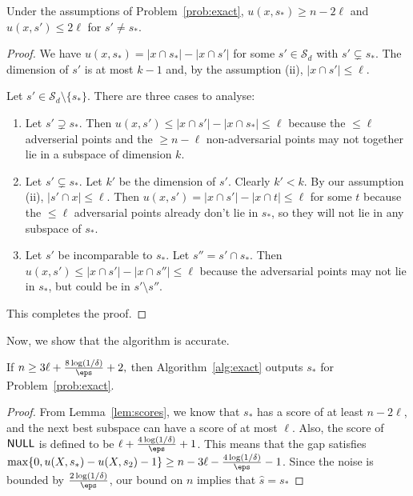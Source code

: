 \begin{lemma}\label{lem:scores}
    Under the assumptions of Problem~\ref{prob:exact}, $u(x,s_*) \ge n - 2\ell$
    and $u(x,s')\le 2\ell$ for $s' \ne s_*$.
\end{lemma}
\begin{proof}
    We have $u(x,s_*) = |x \cap s_*| - |x \cap s'|$ for some
    $s' \in \mathcal{S}_d$ with $s' \subsetneq s_*$. The
    dimension of $s'$ is at most $k-1$ and, by the assumption
    (ii), $|x \cap s'| \le \ell$. 
    
    Let $s' \in \mathcal{S}_d \setminus \{s_*\}$.
    There are three cases to analyse:
    \begin{enumerate}
        \item Let $s' \supsetneq s_*$. Then
            $u(x,s') \le |x \cap s'| - |x \cap s_*| \leq \ell$
            because the $\leq \ell$ adverserial points and the $\geq n-\ell$
            non-adversarial points may not together lie in a subspace
            of dimension $k$.

        \item Let $s' \subsetneq s_*$. Let
            $k'$ be the dimension of $s'$. Clearly $k'<k$.
            By our assumption (ii), $|s' \cap x| \le \ell$.
            Then $u(x,s') = |x \cap s'| - |x \cap t| \le \ell$
            for some $t$ because the $\leq \ell$ adversarial points
            already don't lie in $s_*$, so they will not lie in
            any subspace of $s_*$.

        \item Let $s'$ be incomparable to $s_*$.
            Let $s'' = s' \cap s_*$. Then
            $u(x,s') \le |x \cap s'| - |x \cap s''| \leq \ell$
            because the adversarial points may not lie in $s_*$,
            but could be in $s'\setminus s''$.
    \end{enumerate}
    This completes the proof.
\end{proof}

Now, we show that the algorithm is accurate.

\begin{lemma}\label{lem:exact-accuracy}
    If
    $n \geq 3\ell + \frac{8\log(1/\delta)}{\eps} + 2,$
    then Algorithm~\ref{alg:exact} outputs $s_*$ for Problem~\ref{prob:exact}.
\end{lemma}
\begin{proof}
    From Lemma~\ref{lem:scores}, we know that $s_*$ has
    a score of at least $n-2\ell$, and the next best subspace
    can have a score of at most $\ell$. Also, the score of
    $\mathsf{NULL}$ is defined to be $\ell + \tfrac{4\log(1/\delta)}{\eps} + 1$.
    This means that the gap satisfies $\max\{ 0 , u(X,s_*) - u(X,s_2) -1\} \ge n - 3\ell - \tfrac{4\log(1/\delta)}{\eps}  -1$.
    Since the noise is bounded by $\tfrac{2\log(1/\delta)}{\eps}$, our bound on $n$ implies that $\hat s = s_*$
\end{proof}

